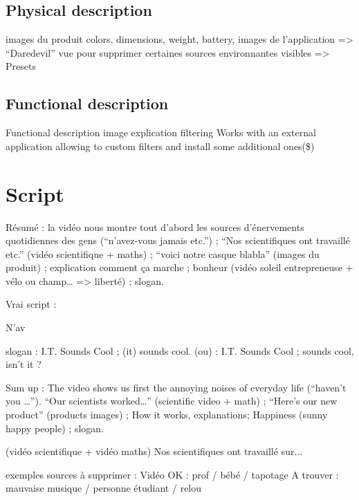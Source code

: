 \documentclass[12pt, a4paper]{article}
\begin{document}
    \subsection{Physical description}

    images du produit
colors, dimensions, weight, battery, 
images de l’application
=> “Daredevil” vue pour supprimer certaines sources environnantes visibles
=> Presets

    \subsection{Functional description}
    Functional description
image explication filtering
Works with an external application allowing to custom filters and install some additional ones(\$) 

\section{Script}

Résumé : la vidéo nous montre tout d’abord les sources d’énervements quotidiennes des gens (“n’avez-vous jamais etc.”) ; “Nos scientifiques ont travaillé etc.” (vidéo scientifique + maths) ; “voici notre casque blabla” (images du produit) ; explication comment ça marche ;
bonheur (vidéo soleil entrepreneuse + vélo ou champ… => liberté) ; slogan.

Vrai script :

N’av

slogan : I.T. Sounds Cool ; (it) sounds cool.
(ou) :  I.T. Sounds Cool ; sounds cool, isn’t it ?

Sum up : The video shows us first the annoying noises of everyday life (“haven’t you …”). “Our scientists worked…” (scientific video + math) ; “Here’s our new product” (products images) ; How it works, explanations; Happiness (sunny happy people) ; slogan.


(vidéo scientifique + vidéo maths)
Nos scientifiques ont travaillé sur...

exemples sources à supprimer :
Vidéo OK : prof / bébé / tapotage
A trouver : mauvaise musique /  personne étudiant / relou


\end{document}
